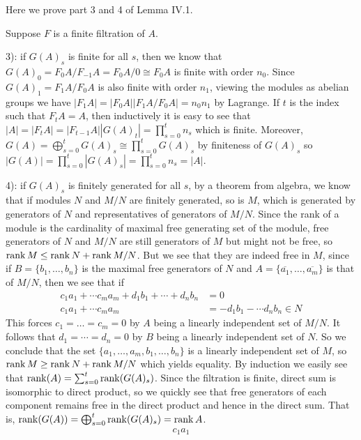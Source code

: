 \documentclass[12pt]{article}
\begin{document}
\begin{problem}[4]
Here we prove part 3 and 4 of Lemma IV.1.

Suppose $ F$ is a finite filtration of  $ A$.

3): if $ G(A)_s$ is finite for all  $ s$, then we know that $ G(A)_0 =  F_0A / F_{-1}A = F_0A / 0 \cong F_0 A$ is finite with order $ n_0$. Since $ G(A)_1 = F_1A / F_0A $ is also finite with order $ n_1$, viewing the modules as abelian groups we have $ |F_1A| = |F_0A| |F_1 A / F_0 A| = n_0 n_1$ by Lagrange. If $ t$ is the index such that $ F_t A = A$, then inductively it is easy to see that $ |A| = |F_t A | = |F_{t-1} A| |G(A)_t| = \prod_{ s= 0}^{ t} n_s$ which is finite. Moreover, $ G(A) = \bigoplus_{ s=0}^{t} G(A)_s \cong \prod_{ s= 0}^{ t} G(A)_s$ by finiteness of $ G(A)_s$ so  $ |G(A)| = \prod_{ s= 0}^{ t} |G(A)_s| = \prod_{ s= 0}^{ t} n_s = |A|$.

4): if $ G(A)_s$ is finitely generated for all  $ s$, by a theorem from algebra, we know that if modules $ N$ and  $ M /N$ are finitely generated, so is  $ M$, which is generated by generators of $ N$ and representatives of generators of  $ M /N$. Since the rank of a module is the cardinality of maximal free generating set of the module, free generators of $ N$ and  $ M /N$ are still generators of  $ M$ but might not be free, so $ \operatorname{rank} M \leq \operatorname{rank} N + \operatorname{rank} M /N$. But we see that they are indeed free in $ M$, since if $ B = \{b_1,\ldots,b_n\} $ is the maximal free generators of  $ N$ and  $ A = \{\overline{a_1},\ldots,\overline{a_m}\} $ is that of $ M /N$, then we see that if
\begin{align*}
	c_1 a_1 + \cdots c_m a_m + d_1 b_1 + \cdots + d_n b_n &= 0 \\
	c_1 a_1 + \cdots c_m a_m &= -d_1 b_1 - \cdots d_n b_n \in N
\end{align*}
This forces $ c_1 = \ldots=c_m = 0$ by $ A$ being a linearly independent set of  $ M /N$. It follows that  $ d_1 = \cdots = d_n = 0$ by $ B$ being a linearly independent set of  $ N$. So we conclude that the set $ \{a_1,\ldots,a_m,b_1,\ldots,b_n\} $ is a linearly independent set of $ M$, so  $ \operatorname{rank} M \geq \operatorname{rank} N + \operatorname{rank} M /N$ which yields equality. By induction we easily see that  $ \operatorname{rank} (A) = \sum_{ s= 0}^{ t} \operatorname{rank} (G(A)_s)$. Since the filtration is finite, direct sum is isomorphic to direct product, so we quickly see that free generators of each component remains free in the direct product and hence in the direct sum. That is, $ \operatorname{rank} (G(A)) = \bigoplus_{ s=0}^{t} \operatorname{rank} (G(A)_s) = \operatorname{rank} A$.
\begin{align*}
	c_1 a_1 
\end{align*}
\end{problem}
\end{document}
